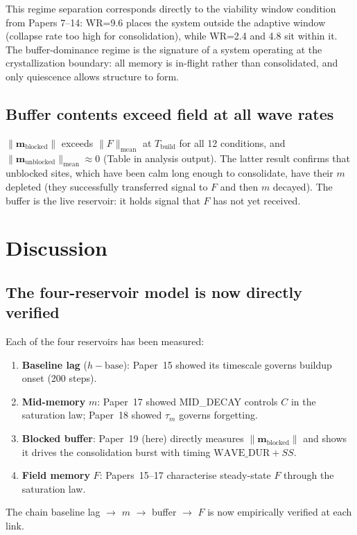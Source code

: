 \documentclass[11pt]{article}
\begin{document}
This regime separation corresponds directly to the viability window condition
from Papers 7--14: WR=9.6 places the system outside the adaptive window
(collapse rate too high for consolidation), while WR=2.4 and 4.8 sit within it.
The buffer-dominance regime is the signature of a system operating at the
crystallization boundary: all memory is in-flight rather than consolidated,
and only quiescence allows structure to form.

\subsection{Buffer contents exceed field at all wave rates}

$\|\mathbf{m}_{\mathrm{blocked}}\|$ exceeds $\|F\|_{\mathrm{mean}}$ at $T_{\mathrm{build}}$
for all 12 conditions, and $\|\mathbf{m}_{\mathrm{unblocked}}\|_{\mathrm{mean}} \approx 0$
(Table in analysis output).
The latter result confirms that unblocked sites, which have been calm long enough
to consolidate, have their $m$ depleted (they successfully transferred signal to $F$
and then $m$ decayed).
The buffer is the live reservoir: it holds signal that $F$ has not yet received.

\section{Discussion}

\subsection{The four-reservoir model is now directly verified}

Each of the four reservoirs has been measured:
\begin{enumerate}
  \item \textbf{Baseline lag} ($h - \mathrm{base}$):
    Paper~15 showed its timescale governs buildup onset (200 steps).
  \item \textbf{Mid-memory} $m$:
    Paper~17 showed MID\_DECAY controls $C$ in the saturation law;
    Paper~18 showed $\tau_m$ governs forgetting.
  \item \textbf{Blocked buffer}:
    Paper~19 (here) directly measures $\|\mathbf{m}_{\mathrm{blocked}}\|$
    and shows it drives the consolidation burst with timing $\mathrm{WAVE\_DUR} + SS$.
  \item \textbf{Field memory} $F$:
    Papers~15--17 characterise steady-state $F$ through the saturation law.
\end{enumerate}
The chain baseline lag $\to$ $m$ $\to$ buffer $\to$ $F$ is now
empirically verified at each link.
\end{document}
